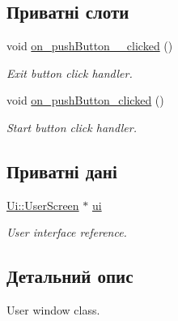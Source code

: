 \subsection*{Приватні слоти}
\begin{DoxyCompactItemize}
\item 
\hypertarget{classUserScreen_a6e25c29ff53726317f4056b66fcb9a18}{void \hyperlink{classUserScreen_a6e25c29ff53726317f4056b66fcb9a18}{on\-\_\-push\-Button\-\_\-\_\-clicked} ()}\label{classUserScreen_a6e25c29ff53726317f4056b66fcb9a18}

\begin{DoxyCompactList}\small\item\em Exit button click handler. \end{DoxyCompactList}\item 
\hypertarget{classUserScreen_a6e79ba614aa7a1af1520cc78d5e7c264}{void \hyperlink{classUserScreen_a6e79ba614aa7a1af1520cc78d5e7c264}{on\-\_\-push\-Button\-\_\-clicked} ()}\label{classUserScreen_a6e79ba614aa7a1af1520cc78d5e7c264}

\begin{DoxyCompactList}\small\item\em Start button click handler. \end{DoxyCompactList}\end{DoxyCompactItemize}
\subsection*{Приватні дані}
\begin{DoxyCompactItemize}
\item 
\hypertarget{classUserScreen_ade24b1857f428a1a247fd622a51c8de8}{\hyperlink{classUi_1_1UserScreen}{Ui\-::\-User\-Screen} $\ast$ \hyperlink{classUserScreen_ade24b1857f428a1a247fd622a51c8de8}{ui}}\label{classUserScreen_ade24b1857f428a1a247fd622a51c8de8}

\begin{DoxyCompactList}\small\item\em User interface reference. \end{DoxyCompactList}\end{DoxyCompactItemize}


\subsection{Детальний опис}
User window class. 

